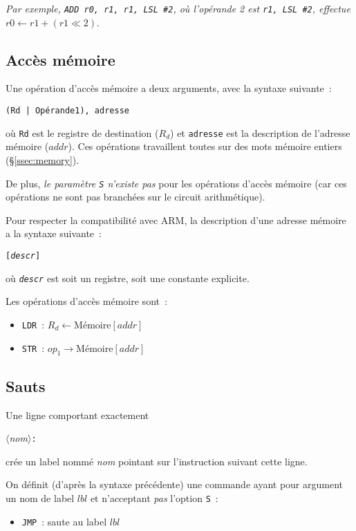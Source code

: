 \documentclass[11pt,a4paper]{article}
\begin{document}
\noindent\textit{Par exemple, \texttt{ADD r0, r1, r1, LSL \#{}2}, où l'opérande 2 est \texttt{r1, LSL \#{}2}, effectue} ${r0 \leftarrow r1 + (r1 \ll 2)}$.

\subsection{Accès mémoire}

Une opération d'accès mémoire a deux arguments, avec la syntaxe suivante~:

\begin{center}\texttt{(Rd~|~Opérande1), adresse}\end{center}

où \texttt{Rd} est le registre de destination ($R_d$) et \texttt{adresse} est la description de l'adresse mémoire ($addr$). Ces opérations travaillent toutes sur des mots mémoire entiers (§\ref{ssec:memory}).

De plus, \emph{le paramètre \texttt{S} n'existe pas} pour les opérations d'accès mémoire (car ces opérations ne sont pas branchées sur le circuit arithmétique).

Pour respecter la compatibilité avec ARM, la description d'une adresse mémoire a la syntaxe suivante~:
\begin{center}\texttt{[\textit{descr}]}\end{center}
où \texttt{\textit{descr}} est soit un registre, soit une constante explicite.

Les opérations d'accès mémoire sont~:

\begin{itemize}
\item \texttt{LDR}~: $R_d \leftarrow  \text{Mémoire}[addr]$
\item \texttt{STR}~: $op_1 \rightarrow \text{Mémoire}[addr]$
\end{itemize}

\subsection{Sauts}

Une ligne comportant exactement
\begin{center}\textit{$\langle$nom$\rangle$}\texttt{:}\end{center}
\noindent{}crée un label nommé \textit{nom} pointant sur l'instruction suivant cette ligne.

On définit (d'après la syntaxe précédente) une commande ayant pour argument un nom de label $lbl$ et n'acceptant \emph{pas} l'option \texttt{S}~:
\begin{itemize}
\item \texttt{JMP}~: saute au label $lbl$
\end{itemize}
\end{document}
